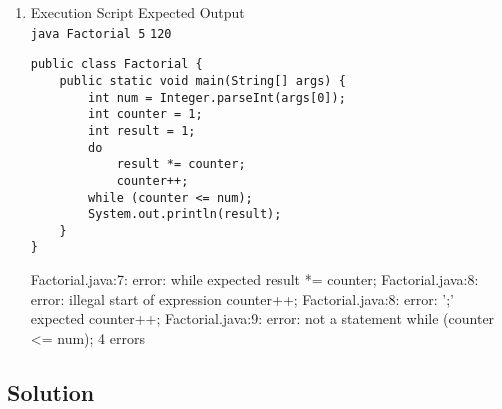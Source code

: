 \begin{enumerate}[label=\textbf{(\alph*)}]
\newpage

\item Execution Script \hfill Expected Output\\
\texttt{java Factorial 5} \hfill \texttt{120}

\begin{lstlisting}
public class Factorial {
	public static void main(String[] args) {
		int num = Integer.parseInt(args[0]);
		int counter = 1;
		int result = 1;
		do
			result *= counter;
			counter++;
		while (counter <= num);
		System.out.println(result);
	}
}
\end{lstlisting}

\begin{terminal}
Factorial.java:7: error: while expected
	result *= counter;
Factorial.java:8: error: illegal start of expression
	counter++;
Factorial.java:8: error: ';' expected
	counter++;
Factorial.java:9: error: not a statement
	while (counter <= num);
4 errors
\end{terminal}

\end{enumerate}

\newpage

\subsection*{Solution}

